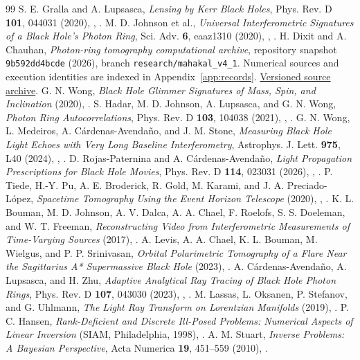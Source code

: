 \small
\begin{thebibliography}{99}
 S. E. Gralla and A. Lupsasca, \emph{Lensing by Kerr Black Holes}, Phys. Rev. D \textbf{101}, 044031 (2020), , .
 M. D. Johnson et al., \emph{Universal Interferometric Signatures of a Black Hole's Photon Ring}, Sci. Adv. \textbf{6}, eaaz1310 (2020), , .
 H. Dixit and A. Chauhan, \emph{Photon-ring tomography computational archive}, repository snapshot \texttt{9b592dd4bcde} (2026), branch \texttt{research/mahakal\_v4\_1}. Numerical sources and execution identities are indexed in Appendix~\ref{app:records}. \href{https://github.com/internalerror404/photon-ring-tomography/tree/9b592dd4bcde20187922ef9d067b72abeaf12cdb}{Versioned source archive}.
 G. N. Wong, \emph{Black Hole Glimmer Signatures of Mass, Spin, and Inclination} (2020), .
 S. Hadar, M. D. Johnson, A. Lupsasca, and G. N. Wong, \emph{Photon Ring Autocorrelations}, Phys. Rev. D \textbf{103}, 104038 (2021), , .
 G. N. Wong, L. Medeiros, A. C\'ardenas-Avenda\~no, and J. M. Stone, \emph{Measuring Black Hole Light Echoes with Very Long Baseline Interferometry}, Astrophys. J. Lett. \textbf{975}, L40 (2024), , .
 D. Rojas-Paternina and A. C\'ardenas-Avenda\~no, \emph{Light Propagation Prescriptions for Black Hole Movies}, Phys. Rev. D \textbf{114}, 023031 (2026), , .
 P. Tiede, H.-Y. Pu, A. E. Broderick, R. Gold, M. Karami, and J. A. Preciado-L\'opez, \emph{Spacetime Tomography Using the Event Horizon Telescope} (2020), , .
 K. L. Bouman, M. D. Johnson, A. V. Dalca, A. A. Chael, F. Roelofs, S. S. Doeleman, and W. T. Freeman, \emph{Reconstructing Video from Interferometric Measurements of Time-Varying Sources} (2017), .
 A. Levis, A. A. Chael, K. L. Bouman, M. Wielgus, and P. P. Srinivasan, \emph{Orbital Polarimetric Tomography of a Flare Near the Sagittarius A* Supermassive Black Hole} (2023), .
 A. C\'ardenas-Avenda\~no, A. Lupsasca, and H. Zhu, \emph{Adaptive Analytical Ray Tracing of Black Hole Photon Rings}, Phys. Rev. D \textbf{107}, 043030 (2023), , .
 M. Lassas, L. Oksanen, P. Stefanov, and G. Uhlmann, \emph{The Light Ray Transform on Lorentzian Manifolds} (2019), .
 P. C. Hansen, \emph{Rank-Deficient and Discrete Ill-Posed Problems: Numerical Aspects of Linear Inversion} (SIAM, Philadelphia, 1998), .
 A. M. Stuart, \emph{Inverse Problems: A Bayesian Perspective}, Acta Numerica \textbf{19}, 451--559 (2010), .
\end{thebibliography}
